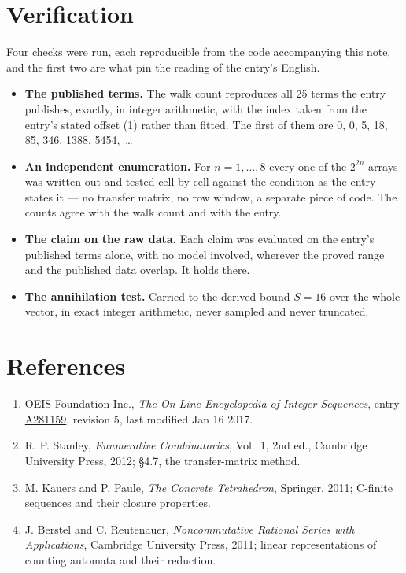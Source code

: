 \documentclass[11pt]{article}
\theoremstyle{definition}
\begin{document}
\section{Verification}

Four checks were run, each reproducible from the code accompanying this note, and the first two are what pin the reading of the entry's English.

\begin{itemize}

\item {\bfseries The published terms.} The walk count reproduces all 25 terms the entry publishes, exactly, in integer arithmetic, with the index taken from the entry's stated offset (1) rather than fitted. The first of them are 0, 0, 5, 18, 85, 346, 1388, 5454,~\dots

\item {\bfseries An independent enumeration.} For $n = 1,\dots,8$ every one of the $2^{2n}$ arrays was written out and tested cell by cell against the condition as the entry states it --- no transfer matrix, no row window, a separate piece of code. The counts agree with the walk count and with the entry.

\item {\bfseries The claim on the raw data.} Each claim was evaluated on the entry's published terms alone, with no model involved, wherever the proved range and the published data overlap. It holds there.

\item {\bfseries The annihilation test.} Carried to the derived bound $S = 16$ over the whole vector, in exact integer arithmetic, never sampled and never truncated.

\end{itemize}

\section{References}

\begin{enumerate}

\item OEIS Foundation Inc., \emph{The On-Line Encyclopedia of Integer Sequences}, entry \href{https://oeis.org/A281159}{A281159}, revision 5, last modified Jan 16 2017.

\item R. P. Stanley, \emph{Enumerative Combinatorics}, Vol.~1, 2nd ed., Cambridge University Press, 2012; \S4.7, the transfer-matrix method.

\item M. Kauers and P. Paule, \emph{The Concrete Tetrahedron}, Springer, 2011; C-finite sequences and their closure properties.

\item J. Berstel and C. Reutenauer, \emph{Noncommutative Rational Series with Applications}, Cambridge University Press, 2011; linear representations of counting automata and their reduction.

\end{enumerate}
\end{document}
